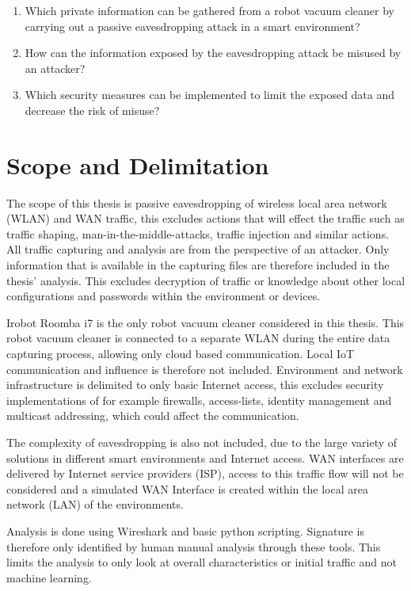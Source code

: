 \begin{enumerate}
    \item Which private information can be gathered from a robot vacuum cleaner by carrying out a passive eavesdropping attack in a smart environment?
    \item How can the information exposed by the eavesdropping attack be misused by an attacker?
    \item Which security measures can be implemented to limit the exposed data and decrease the risk of misuse?
\end{enumerate}

\section{Scope and Delimitation}

The scope of this thesis is passive eavesdropping of wireless local area network (WLAN) and WAN traffic, this excludes actions that will effect the traffic such as traffic shaping, man-in-the-middle-attacks, traffic injection and similar actions. All traffic capturing and analysis are from the perspective of an attacker. Only information that is available in the capturing files are therefore included in the thesis' analysis. This excludes decryption of traffic or knowledge about other local configurations and passwords within the environment or devices. 

Irobot Roomba i7 is the only robot vacuum cleaner considered in this thesis. This robot vacuum cleaner is connected to a separate WLAN during the entire data capturing process, allowing only cloud based communication. Local IoT communication and influence is therefore not included. Environment and network infrastructure is delimited to only basic Internet access, this excludes security implementations of for example firewalls, access-lists, identity management and multicast addressing, which could affect the communication. 

The complexity of eavesdropping is also not included, due to the large variety of solutions in different smart environments and Internet access. WAN interfaces are delivered by Internet service providers (ISP), access to this traffic flow will not be considered and a simulated WAN Interface is created within the local area network (LAN) of the environments. 

Analysis is done using Wireshark and basic python scripting. Signature is therefore only identified by human manual analysis through these tools. This limits the analysis to only look at overall characteristics or initial traffic and not machine learning.

